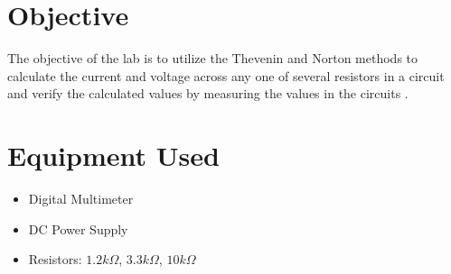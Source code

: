 \documentclass[a4paper]{article}
\begin{document}
\section{Objective}
The objective of the lab is to utilize the Thevenin and Norton methods to calculate the current and voltage across any one of several resistors in a circuit and verify the calculated values by measuring the values in the circuits \cite{UNCC-ECE-Dept:2023}.
\section{Equipment Used}

\begin{itemize}
    \item Digital Multimeter
    \item DC Power Supply
    \item Resistors: $1.2k\Omega$, $3.3k\Omega$, $10k\Omega$
\end{itemize}
\end{document}
